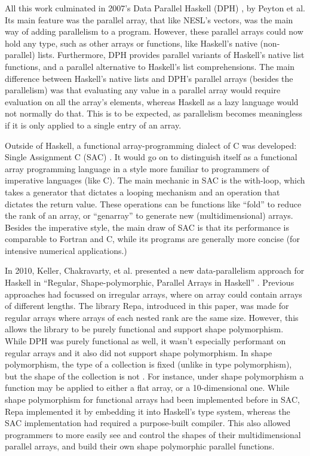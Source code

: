         All this work culminated in 2007's Data Parallel Haskell (DPH) \cite{peyton2008harnessing}, by Peyton et al.
        Its main feature was the parallel array, that like NESL's vectors, was the main way of adding parallelism to a program.
        However, these parallel arrays could now hold any type, such as other arrays or functions, like Haskell's native (non-parallel) lists.
        Furthermore, DPH provides parallel variants of Haskell's native list functions, and a parallel alternative to Haskell's list comprehensions.
        The main difference between Haskell's native lists and DPH's parallel arrays (besides the parallelism) was that evaluating any value in a parallel array would require evaluation on all the array's elements, whereas Haskell as a lazy language would not normally do that.
        This is to be expected, as parallelism becomes meaningless if it is only applied to a single entry of an array.

        Outside of Haskell, a functional array-programming dialect of C was developed: Single Assignment C (SAC) \cite{scholz1994single, scholz2003single, grelck2005generic}.
        It would go on to distinguish itself as a functional array programming language in a style more familiar to programmers of imperative languages (like C).
        The main mechanic in SAC is the with-loop, which takes a generator that dictates a looping mechanism and an operation that dictates the return value.
        These operations can be functions like ``fold'' to reduce the rank of an array, or ``genarray'' to generate new (multidimensional) arrays.
        Besides the imperative style, the main draw of SAC is that its performance is comparable to Fortran and C, while its programs are generally more concise (for intensive numerical applications.)

        In 2010, Keller, Chakravarty, et al. presented a new data-parallelism approach for Haskell in ``Regular, Shape-polymorphic, Parallel Arrays in Haskell'' \cite{keller2010regular}.
        Previous approaches had focussed on irregular arrays, where on array could contain arrays of different lengths.
        The library Repa, introduced in this paper, was made for regular arrays where arrays of each nested rank are the same size.
        However, this allows the library to be purely functional and support shape polymorphism.
        While DPH was purely functional as well, it wasn't especially performant on regular arrays and it also did not support shape polymorphism.
        In shape polymorphism, the type of a collection is fixed (unlike in type polymorphism), but the shape of the collection is not \cite{jay1994shapely}.
        For instance, under shape polymorphism a function may be applied to either a flat array, or a 10-dimensional one.
        While shape polymorphism for functional arrays had been implemented before in SAC, Repa implemented it by embedding it into Haskell's type system, whereas the SAC implementation had required a purpose-built compiler.
        This also allowed programmers to more easily see and control the shapes of their multidimensional parallel arrays, and build their own shape polymorphic parallel functions.

